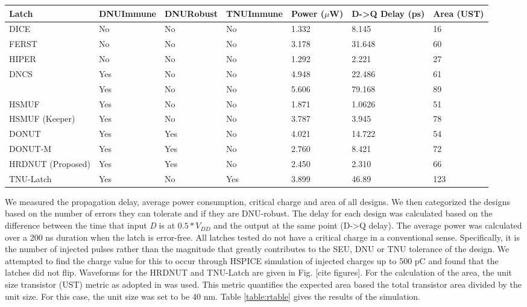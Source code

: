 \begin{table*}[t]
	\begin{center}
		\caption{SPICE Simulations of Existing Latches using the 1.05V 32nm PTM library }
		\label{table:rtable}
		\begin{tabular}{|m{7em}|m{3.5em}|m{3em}|m{3.5em}|m{2em}|m{3.5em}|m{2em}|}
			\hline
			Latch & DNU\newline Immune & DNU\newline Robust & TNU\newline Immune & Power ($\mu$W) & D-\textgreater Q Delay (ps) & Area (UST)\\ 
			\hline
			DICE & No & No & No & 1.332 & 8.145 & 16 \\
			\hline
			FERST & No & No & No & 3.178 & 31.648 & 60 \\
			\hline
			HIPER & No & No & No & 1.292 & 2.221 & 27 \\
			\hhline{|=|=|=|=|=|=|=|}
			DNCS & Yes & No & No & 4.948 & 22.486 & 61 \\
			\hline
			\cite{Inter} & Yes & No & No & 5.606 & 79.168 & 89 \\
			\hline
			HSMUF & Yes & No & No & 1.871 & 1.0626 & 51 \\
			\hline
			HSMUF (Keeper) & Yes & No & No & 3.787 & 3.945 & 78 \\
			\hhline{|=|=|=|=|=|=|=|}
			DONUT \cite{DONUT} & Yes & Yes & No & 4.021 & 14.722 & 54 \\ 
			\hline
			DONUT-M & Yes & Yes & No & 2.760 & 8.421 & 72\\
			\hline
			HRDNUT (Proposed) & Yes & Yes & No & 2.450 & 2.310 & 66 \\
			\hline
			TNU-Latch & Yes & No & Yes & 3.899 & 46.89 & 123 \\
			\hline
		\end{tabular}
	\end{center}
\end{table*}
\raggedbottom
We measured the propagation delay, average power consumption, critical charge and area of all designs. We then categorized the designs based on the number of errors they can tolerate and if they are DNU-robust. The delay for each design was calculated based on the difference between the time that input \textit{D} is at $0.5*V_{DD}$ and the output at the same point (D-\textgreater Q delay). The average power was calculated over a 200 ns duration when the latch is error-free. All latches tested do not have a critical charge in a conventional sense. Specifically, it is the number of injected pulses rather than the magnitude that greatly contributes to the SEU, DNU or TNU tolerance of the design. We attempted to find the charge value for this to occur through HSPICE simulation of injected charges up to 500 pC and found that the latches did not flip. Waveforms for the HRDNUT and TNU-Latch are given in Fig. [cite figures]. For the calculation of the area, the unit size transistor (UST) metric as adopted in \cite{DNCS} was used. This metric quantifies the expected area based the total transistor area divided by the unit size. For this case, the unit size was set to be 40 nm. Table \ref{table:rtable} gives the results of the simulation.

